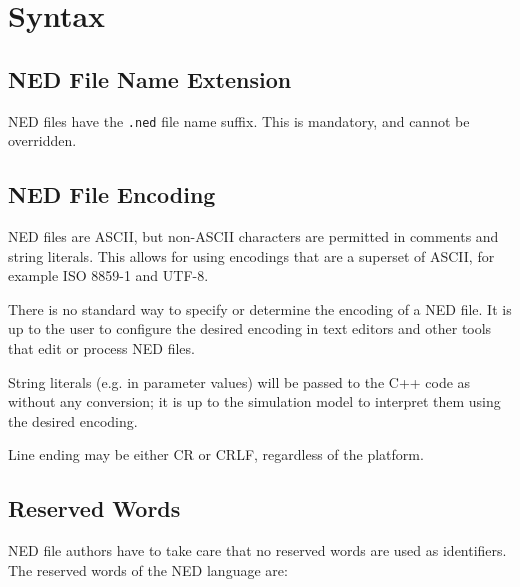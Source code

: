 \label{cha:ned-ref}

\section{Syntax}
\label{sec:ned-ref:syntax}

\subsection{NED File Name Extension}
\label{sec:ned-ref:ned-file-name-extension}

NED files have the \texttt{.ned} file name suffix. This is mandatory, and
cannot be overridden.

\subsection{NED File Encoding}
\label{sec:ned-ref:ned-file-encoding}

NED files are ASCII, but non-ASCII characters are permitted in comments
and string literals. This allows for using encodings that are a superset
of ASCII, for example ISO 8859-1 and UTF-8.

\begin{note}
    There is no standard way to specify or determine the encoding of a NED file.
    It is up to the user to configure the desired encoding in text editors
    and other tools that edit or process NED files.
\end{note}

String literals (e.g. in parameter values) will be passed to the C++ code
as  without any conversion; it is up to the simulation model
to interpret them using the desired encoding.

Line ending may be either CR or CRLF, regardless of the platform.


\subsection{Reserved Words}
\label{sec:ned-ref:reserved-words}

NED file authors have to take care that no reserved words are used as identifiers.
The reserved words of the NED language are:



